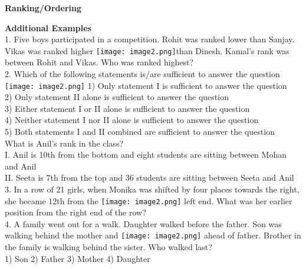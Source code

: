 \documentclass[
]{article}
\author{}
\date{}
\begin{document}
	
 

\begin{center}
	{\Large \textbf{Ranking/Ordering \\}}
\end{center}

{\large \textbf{Additional Examples  \\}}
1. Five boys participated in a competition. Rohit was ranked lower than Sanjay. Vikas was ranked higher \texttt{[image: image2.png]}than Dinesh. Kamal's rank was between Rohit and Vikas. Who was ranked highest?\\

2. Which of the following statements is/are sufficient to answer the question\\
\texttt{[image: image2.png]}
1) Only statement I is sufficient to answer the question\\
2) Only statement II alone is sufficient to answer the question\\
3) Either statement I or II alone is sufficient to answer the question\\
4) Neither statement I nor II alone is sufficient to answer the question\\
5) Both statements I and II combined are sufficient to answer the question\\
What is Anil’s rank in the class?\\
I. Anil is 10th from the bottom and eight students are sitting between Mohan and Anil\\
II. Seeta is 7th from the top and 36 students are sitting between Seeta and Anil\\

3. In a row of 21 girls, when Monika was shifted by four places towards the right, she became 12th from the \texttt{[image: image2.png]} left end. What was her earlier position from the right end of the row?\\

4. A family went out for a walk. Daughter walked before the father. Son was walking behind the mother and \texttt{[image: image2.png]} ahead of father. Brother in the family is walking behind the sister. Who walked last?\\
1) Son \hspace{2mm}2) Father \hspace{2mm}3) Mother \hspace{2mm}4) Daughter\\
\end{document}

